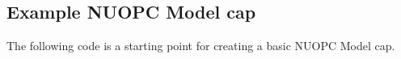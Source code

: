  
\setlength{\oldparskip}{\parskip}
\setlength{\parskip}{1.5ex}
\setlength{\oldparindent}{\parindent}
\setlength{\parindent}{0pt}
\setlength{\oldbaselineskip}{\baselineskip}
\setlength{\baselineskip}{11pt}
 
\def\bv{\begin{verbatim}}
\def\ev{\end{verbatim}}
\def\be{\begin{equation}}
\def\ee{\end{equation}}
\def\bea{\begin{eqnarray}}
\def\eea{\end{eqnarray}}
\def\bi{\begin{itemize}}
\def\ei{\end{itemize}}
\def\bn{\begin{enumerate}}
\def\en{\end{enumerate}}
\def\bd{\begin{description}}
\def\ed{\end{description}}
\def\({\left (}
\def\){\right )}
\def\[{\left [}
\def\]{\right ]}
\def\<{\left  \langle}
\def\>{\right \rangle}
\def\cI{{\cal I}}
\def\diag{\mathop{\rm diag}}
\def\tr{\mathop{\rm tr}}


 

  \subsection{Example NUOPC Model cap}
  \label{sec:basicexamplecap}
  
   The following code is a starting point for creating a basic NUOPC 
   Model cap.  
    

